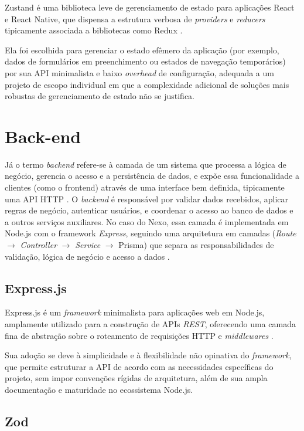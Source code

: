 Zustand é uma biblioteca leve de gerenciamento de estado para aplicações
React e React Native, que dispensa a estrutura verbosa de \textit{providers}
e \textit{reducers} tipicamente associada a bibliotecas como Redux
\citep{zustand:2026}.

Ela foi escolhida para gerenciar o estado efêmero da aplicação (por exemplo,
dados de formulários em preenchimento ou estados de navegação temporários)
por sua API minimalista e baixo \textit{overhead} de configuração, adequada a um
projeto de escopo individual em que a complexidade adicional de soluções
mais robustas de gerenciamento de estado não se justifica.

\section{Back-end}

Já o termo \textit{backend} refere-se à camada de um sistema que processa a
lógica de negócio, gerencia o acesso e a persistência de dados, e expõe essa
funcionalidade a clientes (como o frontend) através de uma interface bem
definida, tipicamente uma API HTTP \cite{Fowler_2013}. O \textit{backend} é
responsável por validar dados recebidos, aplicar regras de negócio, autenticar
usuários, e coordenar o acesso ao banco de dados e a outros serviços
auxiliares. No caso do Nexo, essa camada é implementada em Node.js com o
framework \textit{Express}, seguindo uma arquitetura em camadas (\textit{Route}
$\rightarrow$ \textit{Controller} $\rightarrow$ \textit{Service} $\rightarrow$
Prisma) que separa as responsabilidades de validação, lógica de negócio e
acesso a dados \cite{Martin_2012}.

\subsection{Express.js}

Express.js é um \textit{framework} minimalista para aplicações web em
Node.js, amplamente utilizado para a construção de APIs \textit{REST},
oferecendo uma camada fina de abstração sobre o roteamento de requisições HTTP e
\textit{middlewares} \citep{express:2026}.

Sua adoção se deve à simplicidade e à flexibilidade não opinativa do
\textit{framework}, que permite estruturar a API de acordo com as
necessidades específicas do projeto, sem impor convenções rígidas de
arquitetura, além de sua ampla documentação e maturidade no ecossistema
Node.js.

\subsection{Zod}

